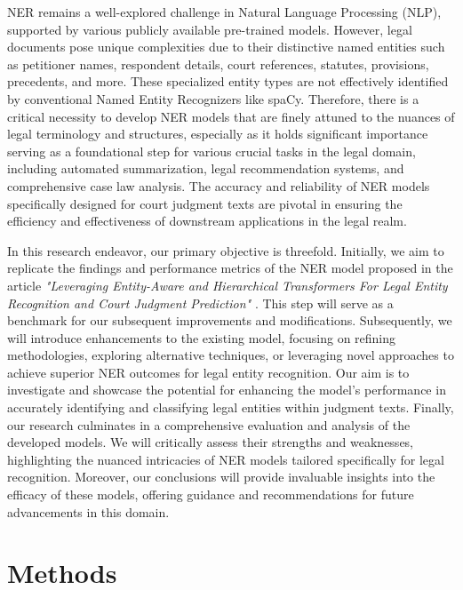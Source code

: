 \documentclass{article}
\begin{document}
NER remains a well-explored challenge in Natural Language Processing (NLP), supported by various publicly available pre-trained models. However, legal documents pose unique complexities due to their distinctive named entities such as petitioner names, respondent details, court references, statutes, provisions, precedents, and more. These specialized entity types are not effectively identified by conventional Named Entity Recognizers like spaCy. Therefore, there is a critical necessity to develop NER models that are finely attuned to the nuances of legal terminology and structures, especially as it holds significant importance serving as a foundational step for various crucial tasks in the legal domain, including automated summarization, legal recommendation systems, and comprehensive case law analysis. The accuracy and reliability of NER models specifically designed for court judgment texts are pivotal in ensuring the efficiency and effectiveness of downstream applications in the legal realm.

In this research endeavor, our primary objective is threefold. Initially, we aim to replicate the findings and performance metrics of the NER model proposed in the article \textit{"Leveraging Entity-Aware and Hierarchical Transformers For Legal Entity Recognition and Court Judgment Prediction"} \cite{article2}. This step will serve as a benchmark for our subsequent improvements and modifications. Subsequently, we will introduce enhancements to the existing model, focusing on refining methodologies, exploring alternative techniques, or leveraging novel approaches to achieve superior NER outcomes for legal entity recognition. Our aim is to investigate and showcase the potential for enhancing the model's performance in accurately identifying and classifying legal entities within judgment texts. Finally, our research culminates in a comprehensive evaluation and analysis of the developed models. We will critically assess their strengths and weaknesses, highlighting the nuanced intricacies of NER models tailored specifically for legal recognition. Moreover, our conclusions will provide invaluable insights into the efficacy of these models, offering guidance and recommendations for future advancements in this domain.



\section{Methods}
\end{document}
